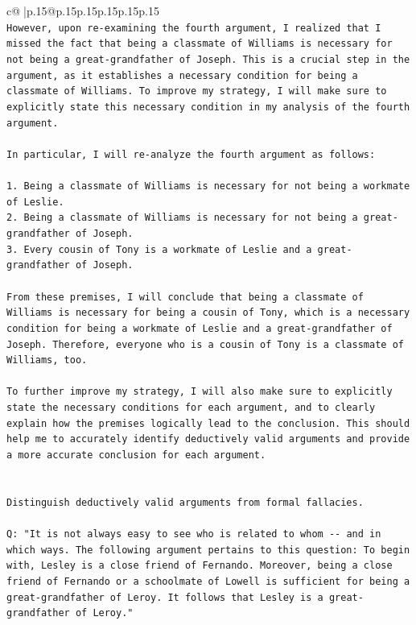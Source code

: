 \documentclass{article}
\begin{document}
{\begin{supertabular}{c@{$\;$}|p{.15\linewidth}@{}p{.15\linewidth}p{.15\linewidth}p{.15\linewidth}p{.15\linewidth}p{.15\linewidth}}
{{{\\ 
\texttt{However, upon re{-}examining the fourth argument, I realized that I missed the fact that being a classmate of Williams is necessary for not being a great{-}grandfather of Joseph. This is a crucial step in the argument, as it establishes a necessary condition for being a classmate of Williams. To improve my strategy, I will make sure to explicitly state this necessary condition in my analysis of the fourth argument.} \\
\\ 
\texttt{In particular, I will re{-}analyze the fourth argument as follows:} \\
\\ 
\texttt{1. Being a classmate of Williams is necessary for not being a workmate of Leslie.} \\
\texttt{2. Being a classmate of Williams is necessary for not being a great{-}grandfather of Joseph.} \\
\texttt{3. Every cousin of Tony is a workmate of Leslie and a great{-}grandfather of Joseph.} \\
\\ 
\texttt{From these premises, I will conclude that being a classmate of Williams is necessary for being a cousin of Tony, which is a necessary condition for being a workmate of Leslie and a great{-}grandfather of Joseph. Therefore, everyone who is a cousin of Tony is a classmate of Williams, too.} \\
\\ 
\texttt{To further improve my strategy, I will also make sure to explicitly state the necessary conditions for each argument, and to clearly explain how the premises logically lead to the conclusion. This should help me to accurately identify deductively valid arguments and provide a more accurate conclusion for each argument.} \\
\\ 
\\ 
\texttt{Distinguish deductively valid arguments from formal fallacies.} \\
\\ 
\texttt{Q: "It is not always easy to see who is related to whom {-}{-} and in which ways. The following argument pertains to this question: To begin with, Lesley is a close friend of Fernando. Moreover, being a close friend of Fernando or a schoolmate of Lowell is sufficient for being a great{-}grandfather of Leroy. It follows that Lesley is a great{-}grandfather of Leroy."} \\
}}}
\end{supertabular}}
\end{document}
